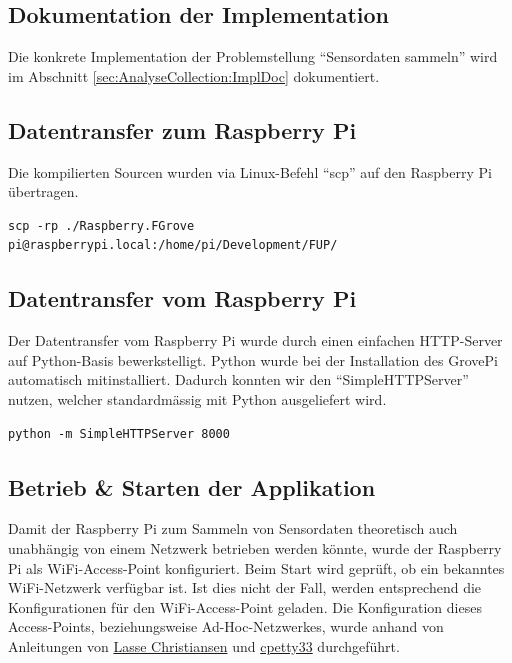 \subsection{Dokumentation der Implementation}
Die konkrete Implementation der Problemstellung "`Sensordaten sammeln"' wird im Abschnitt \ref{sec:AnalyseCollection:ImplDoc}  dokumentiert.

\subsection{Datentransfer zum Raspberry Pi}
Die kompilierten Sourcen wurden via Linux-Befehl "`scp"' auf den Raspberry Pi übertragen.

\begin{lstlisting}
scp -rp ./Raspberry.FGrove pi@raspberrypi.local:/home/pi/Development/FUP/
\end{lstlisting}

\subsection{Datentransfer vom Raspberry Pi}
Der Datentransfer vom Raspberry Pi wurde durch einen einfachen HTTP-Server auf Python-Basis bewerkstelligt. Python wurde bei der Installation des GrovePi automatisch mitinstalliert. Dadurch konnten wir den "`SimpleHTTPServer"' nutzen, welcher standardmässig mit Python ausgeliefert wird.

\begin{lstlisting}
python -m SimpleHTTPServer 8000
\end{lstlisting}


\subsection{Betrieb \& Starten der Applikation}
Damit der Raspberry Pi zum Sammeln von Sensordaten theoretisch auch unabhängig von einem Netzwerk betrieben werden könnte, wurde der Raspberry Pi als WiFi-Access-Point konfiguriert. Beim Start wird geprüft, ob ein bekanntes WiFi-Netzwerk verfügbar ist. Ist dies nicht der Fall, werden entsprechend die Konfigurationen für den WiFi-Access-Point geladen. Die Konfiguration dieses Access-Points, beziehungsweise Ad-Hoc-Netzwerkes, wurde anhand von Anleitungen von \hyperlink{http://lcdev.dk/2012/11/18/raspberry-pi-tutorial-connect-to-wifi-or-create-an-encrypted-dhcp-enabled-ad-hoc-network-as-fallback/}{Lasse Christiansen} und \hyperlink{http://slicepi.com/creating-an-ad-hoc-network-for-your-raspberry-pi/}{cpetty33} durchgeführt.



